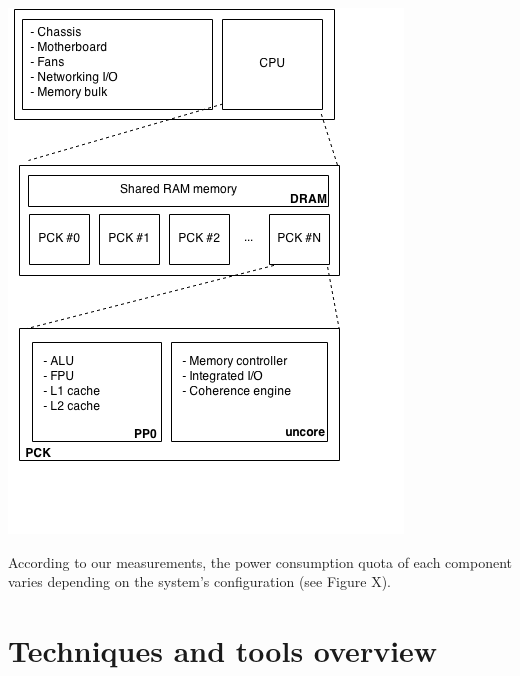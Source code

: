 \documentclass[portrait,a1,final]{a0poster} %
\newcommand{\figurespace}{10mm} %
\begin{document}
\begin{minipage}[tc]{0.9\linewidth}
\begin{minipage}[t]{0.5\linewidth}

\vspace{0.01\linewidth} %

\begin{minipage}[b]{1\linewidth}
\centering
\includegraphics[width=0.5\linewidth]{./figs/energy_system.png}
\vspace{-0.1\linewidth}
\captionsetup{font=scriptsize, width=.75\linewidth}
\vspace{\figurespace}
\end{minipage}

According to our measurements, the power consumption quota of each component varies depending on the system's configuration (see Figure X).  



\section{Techniques and tools overview}
\begin{minipage}[b]{1\linewidth}


\end{minipage}
\end{minipage}
\end{minipage}
\end{document}
